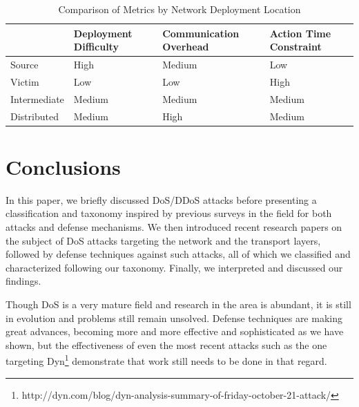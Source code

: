 \documentclass[conference]{IEEEtran}
\begin{document}
{
\tabulinesep=1mm
\begin{table}[!htb]
  \centering
  \begin{tabu} to 0.5\textwidth {| X[1,r] || X[1,c] | X[1,c] | X[1,c] |}
     \hline
      & Deployment Difficulty & Communication Overhead & Action Time Constraint \\\hline\hline
     Source       & High   & Medium & Low    \\\hline
     Victim       & Low    & Low    & High   \\\hline
     Intermediate & Medium & Medium & Medium \\\hline
     Distributed  & Medium & High   & Medium \\\hline
  \end{tabu}
  \smallskip
  \caption{Comparison of Metrics by Network Deployment Location}
  \label{tab:defense}
\end{table}
}

\section{Conclusions}
In this paper, we briefly discussed DoS/DDoS attacks before presenting a classification and taxonomy inspired by previous surveys in the field for both attacks and defense mechanisms. We then introduced recent research papers on the subject of DoS attacks targeting the network and the transport layers, followed by defense techniques against such attacks, all of which we classified and characterized following our taxonomy. Finally, we interpreted and discussed our findings.

Though DoS is a very mature field and research in the area is abundant, it is still in evolution and problems still remain unsolved. Defense techniques are making great advances, becoming more and more effective and sophisticated as we have shown, but the effectiveness of even the most recent attacks such as the one targeting Dyn\footnote{http://dyn.com/blog/dyn-analysis-summary-of-friday-october-21-attack/} demonstrate that work still needs to be done in that regard.



\end{document}
